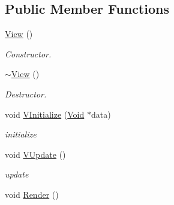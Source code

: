 \subsection*{Public Member Functions}
\begin{DoxyCompactItemize}
\item 
\hypertarget{classContent_1_1View_1_1Admin_1_1Human_1_1View_a13474e10ab12948897ce59aed7ef8ea4}{
\hyperlink{classContent_1_1View_1_1Admin_1_1Human_1_1View_a13474e10ab12948897ce59aed7ef8ea4}{View} ()}
\label{classContent_1_1View_1_1Admin_1_1Human_1_1View_a13474e10ab12948897ce59aed7ef8ea4}

\begin{DoxyCompactList}\small\item\em Constructor. \item\end{DoxyCompactList}\item 
\hypertarget{classContent_1_1View_1_1Admin_1_1Human_1_1View_ac9422a180b81c9cd77a789b487cad8e4}{
\hyperlink{classContent_1_1View_1_1Admin_1_1Human_1_1View_ac9422a180b81c9cd77a789b487cad8e4}{$\sim$View} ()}
\label{classContent_1_1View_1_1Admin_1_1Human_1_1View_ac9422a180b81c9cd77a789b487cad8e4}

\begin{DoxyCompactList}\small\item\em Destructor. \item\end{DoxyCompactList}\item 
\hypertarget{classContent_1_1View_1_1Admin_1_1Human_1_1View_af5f2afac745f352197f4ecf6c3ec051f}{
void \hyperlink{classContent_1_1View_1_1Admin_1_1Human_1_1View_af5f2afac745f352197f4ecf6c3ec051f}{VInitialize} (\hyperlink{structVoid}{Void} $\ast$data)}
\label{classContent_1_1View_1_1Admin_1_1Human_1_1View_af5f2afac745f352197f4ecf6c3ec051f}

\begin{DoxyCompactList}\small\item\em initialize \item\end{DoxyCompactList}\item 
\hypertarget{classContent_1_1View_1_1Admin_1_1Human_1_1View_a22cfcc1c79336072654239ff7680eac8}{
void \hyperlink{classContent_1_1View_1_1Admin_1_1Human_1_1View_a22cfcc1c79336072654239ff7680eac8}{VUpdate} ()}
\label{classContent_1_1View_1_1Admin_1_1Human_1_1View_a22cfcc1c79336072654239ff7680eac8}

\begin{DoxyCompactList}\small\item\em update \item\end{DoxyCompactList}\item 
\hypertarget{classContent_1_1View_1_1Admin_1_1Human_1_1View_ac69936b6aa4ee74ff65a6fea2f9a491f}{
void \hyperlink{classContent_1_1View_1_1Admin_1_1Human_1_1View_ac69936b6aa4ee74ff65a6fea2f9a491f}{Render} ()}
\label{classContent_1_1View_1_1Admin_1_1Human_1_1View_ac69936b6aa4ee74ff65a6fea2f9a491f}


\end{DoxyCompactItemize}
